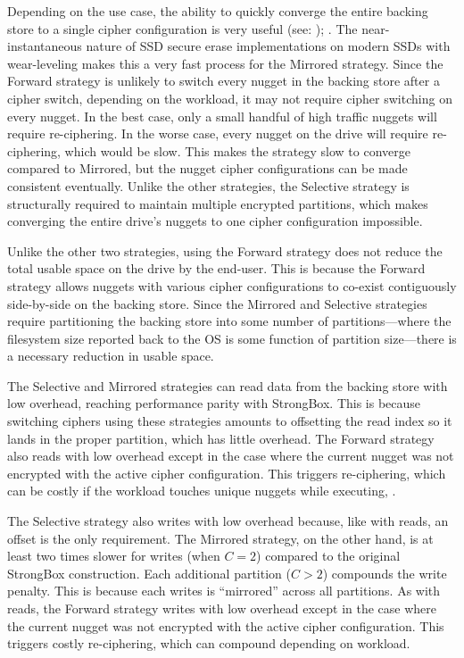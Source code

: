 Depending on the use case, the ability to quickly converge the entire backing
store to a single cipher configuration is very useful (see: );
. The near-instantaneous nature of SSD secure erase implementations on
modern SSDs with wear-leveling makes this a very fast process for the Mirrored
strategy. Since the Forward strategy is unlikely to switch every nugget in the
backing store after a cipher switch, depending on the workload, it may not
require cipher switching on every nugget. In the best case, only a small handful
of high traffic nuggets will require re-ciphering. In the worse case, every
nugget on the drive will require re-ciphering, which would be slow. This makes
the strategy slow to converge compared to Mirrored, but the nugget cipher
configurations can be made consistent eventually. Unlike the other strategies,
the Selective strategy is structurally required to maintain multiple encrypted
partitions, which makes converging the entire drive's nuggets to one cipher
configuration impossible.

Unlike the other two strategies, using the Forward strategy does not reduce the
total usable space on the drive by the end-user. This is because the Forward
strategy allows nuggets with various cipher configurations to co-exist
contiguously side-by-side on the backing store. Since the Mirrored and Selective
strategies require partitioning the backing store into some number of
partitions---where the filesystem size reported back to the OS is some function
of partition size---there is a necessary reduction in usable space.

The Selective and Mirrored strategies can read data from the backing store with
low overhead, reaching performance parity with StrongBox. This is because
switching ciphers using these strategies amounts to offsetting the read index so
it lands in the proper partition, which has little overhead. The Forward
strategy also reads with low overhead except in the case where the current
nugget was not encrypted with the active cipher configuration. This triggers
re-ciphering, which can be costly if the workload touches unique nuggets while
executing, .

The Selective strategy also writes with low overhead because, like with reads,
an offset is the only requirement. The Mirrored strategy, on the other hand, is
at least two times slower for writes (when $C = 2$) compared to the original
StrongBox construction. Each additional partition ($C > 2$) compounds the write
penalty. This is because each writes is ``mirrored'' across all partitions. As
with reads, the Forward strategy writes with low overhead except in the case
where the current nugget was not encrypted with the active cipher configuration.
This triggers costly re-ciphering, which can compound depending on workload.


